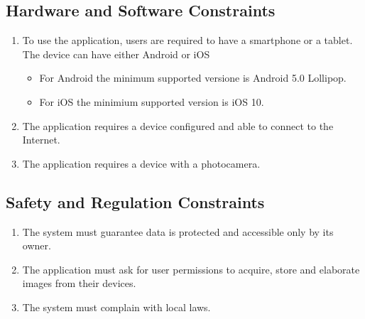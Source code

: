 \subsection{Hardware  and Software Constraints}
\begin{enumerate}
    \item To use the application, users are required to have a smartphone or a tablet. The device can have either Android or iOS 
        \begin{itemize}
            \item For Android the minimum supported versione is Android 5.0 Lollipop.
            \item For iOS the minimium supported version is iOS 10.
        \end{itemize}
    \item The application requires a device configured and able to connect to the Internet.
    \item The application requires a device with a photocamera.
\end{enumerate}

\subsection{Safety and Regulation Constraints}
\begin{enumerate}
    \item The system must guarantee data is protected and accessible only by its owner.
    \item The application must ask for user permissions to acquire, store and elaborate images from their devices.
    \item The system must complain with local laws.  
\end{enumerate}


